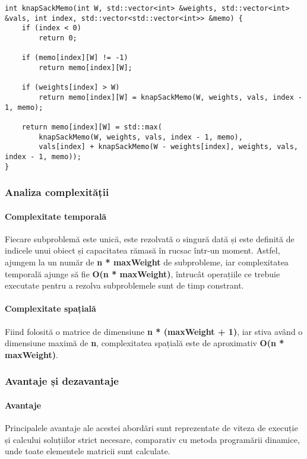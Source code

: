 \documentclass[runningheads]{llncs}
\begin{document}
\begin{lstlisting}
int knapSackMemo(int W, std::vector<int> &weights, std::vector<int> &vals, int index, std::vector<std::vector<int>> &memo) {
	if (index < 0)
		return 0;
	
	if (memo[index][W] != -1)
		return memo[index][W];

	if (weights[index] > W)
		return memo[index][W] = knapSackMemo(W, weights, vals, index - 1, memo);

	return memo[index][W] = std::max(
		knapSackMemo(W, weights, vals, index - 1, memo),
		vals[index] + knapSackMemo(W - weights[index], weights, vals, index - 1, memo));
}
\end{lstlisting}

\subsubsection{Analiza complexității}

\paragraph{Complexitate temporală} Fiecare subproblemă este unică, este rezolvată o singură
dată și este definită de indicele unui obiect și capacitatea rămasă în rucsac într-un moment.
Astfel, ajungem la un număr de \textbf{n * maxWeight} de subprobleme, iar complexitatea
temporală ajunge să fie \textbf{O(n * maxWeight)}, întrucât operațiile ce trebuie executate
pentru a rezolva subproblemele sunt de timp constrant.

\paragraph{Complexitate spațială} Fiind folosită o matrice de dimensiune \textbf{n * (maxWeight + 1)},
iar stiva având o dimensiune maximă de \textbf{n}, complexitatea spațială este de aproximativ
\textbf{O(n * maxWeight)}.

\subsubsection{Avantaje și dezavantaje}

\paragraph{Avantaje} Principalele avantaje ale acestei abordări sunt reprezentate de viteza
de execuție și calcului soluțiilor strict necesare, comparativ cu metoda programării dinamice,
unde toate elementele matricii sunt calculate.
\end{document}
